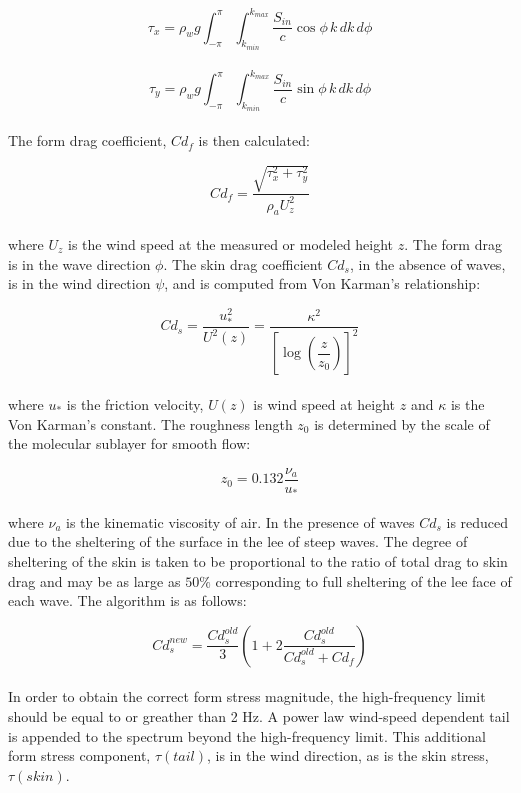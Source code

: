 \documentclass[letterpaper]{article}
\numberwithin{equation}{section}
\begin{document}
\begin{equation}
\tau_{x}=\rho_{w}g\int_{-\pi}^{\pi}\!\int_{k_{min}}^{k_{max}}\dfrac{S_{in}}{c}\cos{\phi}\,k\,dk\,d\phi
\end{equation}
\\
\begin{equation}
\tau_{y}=\rho_{w}g\int_{-\pi}^{\pi}\!\int_{k_{min}}^{k_{max}}\dfrac{S_{in}}{c}\sin{\phi}\,k\,dk\,d\phi
\end{equation}
\\
The form drag coefficient, $Cd_{f}$ is then calculated:

\begin{equation}
Cd_{f}=\dfrac{\sqrt{\tau_{x}^{2}+\tau_{y}^{2}}}{\rho_{a}U_{z}^{2}}
\end{equation}
\\
where $U_{z}$ is the wind speed at the measured or modeled height $z$.
The form drag is in the wave direction $\phi$. 
The skin drag coefficient $Cd_{s}$, in the absence of waves, is in the wind direction $\psi$,
and is computed from Von Karman's relationship:

\begin{equation}
Cd_{s} = \dfrac{u_{*}^{2}}{U^{2}(z)} = \dfrac{\kappa^{2}}{\left[\log{\left(\dfrac{z}{z_{0}}\right)}\right]^{2}}
\end{equation}
\\
where $u_{*}$ is the friction velocity, $U(z)$ is wind speed at height $z$ and $\kappa$ is the Von Karman's constant.
The roughness length $z_0$ is determined by the scale of the molecular sublayer for smooth flow:

\begin{equation}
z_{0} = 0.132\dfrac{\nu_{a}}{u_{*}} 
\end{equation}
\\
where $\nu_{a}$ is the kinematic viscosity of air.
In the presence of waves $Cd_{s}$ is reduced due to the sheltering of the surface in the lee of steep waves. 
The degree of sheltering of the skin is taken to be proportional to the ratio of total drag to skin drag 
and may be as large as $50\%$ corresponding to full sheltering of the lee face of each wave. 
The algorithm is as follows:

\begin{equation}
Cd_{s}^{new}=\dfrac{Cd_{s}^{old}}{3}\left(1+2\dfrac{Cd_{s}^{old}}{Cd_{s}^{old}+Cd_{f}}\right)
\end{equation}
\\
In order to obtain the correct form stress magnitude,
the high-frequency limit should be equal to or greather than 2 Hz.
A power law wind-speed dependent tail is appended to the spectrum
beyond the high-frequency limit. This additional form stress component, $\tau(tail)$, is in the wind direction, as is the skin stress, $\tau(skin)$.  
\end{document}
